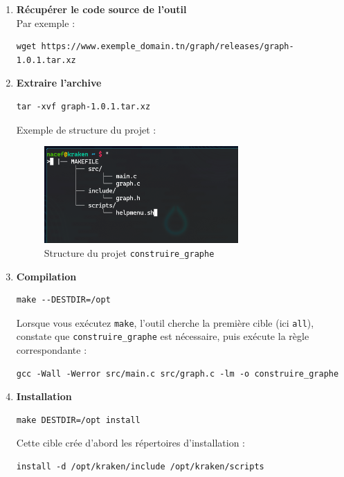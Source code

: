 \begin{enumerate}
  \item \textbf{Récupérer le code source de l’outil\\}  
    Par exemple :\\
    \begin{verbatim}
wget https://www.exemple_domain.tn/graph/releases/graph-1.0.1.tar.xz
    \end{verbatim}

  \item \textbf{Extraire l’archive}  
    \begin{verbatim}
tar -xvf graph-1.0.1.tar.xz
    \end{verbatim}

    Exemple de structure du projet :
    \begin{figure}[H]
      \centering
      \includegraphics[width=0.7\textwidth]{images_pfe/construire_graph_structure.png}
      \caption{Structure du projet \texttt{construire\_graphe}}
      \label{fig:construire_graph}
    \end{figure}

  \item \textbf{Compilation}  
    \begin{verbatim}
make --DESTDIR=/opt
    \end{verbatim}
    Lorsque vous exécutez \texttt{make}, l’outil cherche la première cible (ici \texttt{all}), constate que \texttt{construire\_graphe} est nécessaire, puis exécute la règle correspondante :  
    \begin{verbatim}
gcc -Wall -Werror src/main.c src/graph.c -lm -o construire_graphe
    \end{verbatim}

  \item \textbf{Installation}  
    \begin{verbatim}
make DESTDIR=/opt install    
    \end{verbatim}
    Cette cible crée d’abord les répertoires d’installation :\\
    \begin{verbatim}
install -d /opt/kraken/include /opt/kraken/scripts


\end{verbatim}
\end{enumerate}
